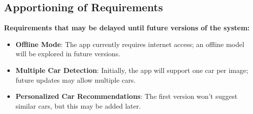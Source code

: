 \documentclass[]{article}
\begin{document}
\subsection{Apportioning of Requirements}
\label{sub:apportioning_of_requirements}
\textbf{Requirements that may be delayed until future versions of the system:}
\begin{itemize}
	\item \textbf{Offline Mode}: The app currently requires internet access; an offline model will be explored in future versions.
    \item \textbf{Multiple Car Detection}: Initially, the app will support one car per image; future updates may allow multiple cars.
    \item \textbf{Personalized Car Recommendations}: The first version won’t suggest similar cars, but this may be added later.
\end{itemize}

\end{document}
